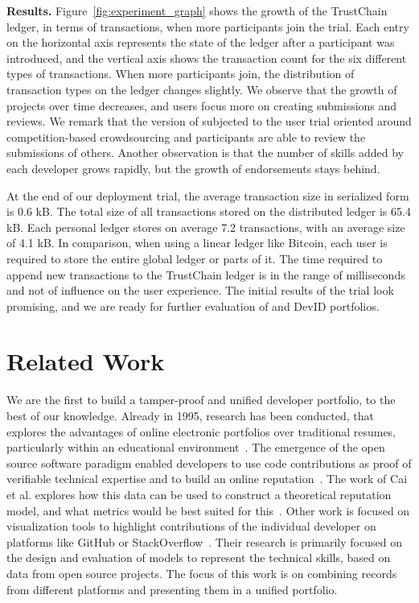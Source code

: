 \textbf{Results.}
Figure~\ref{fig:experiment_graph} shows the growth of the TrustChain ledger, in terms of transactions, when more participants join the trial.
Each entry on the horizontal axis represents the state of the ledger after a participant was introduced, and the vertical axis shows the transaction count for the six different types of transactions.
When more participants join, the distribution of transaction types on the ledger changes slightly.
We observe that the growth of projects over time decreases, and users focus more on creating submissions and reviews.
We remark that the version of \Dappcoder{} subjected to the user trial oriented around competition-based crowdsourcing and participants are able to review the submissions of others.
Another observation is that the number of skills added by each developer grows rapidly, but the growth of endorsements stays behind.

At the end of our deployment trial, the average transaction size in serialized form is 0.6 kB.
The total size of all transactions stored on the distributed ledger is 65.4 kB.
Each personal ledger stores on average 7.2 transactions, with an average size of 4.1 kB.
In comparison, when using a linear ledger like Bitcoin, each user is required to store the entire global ledger or parts of it.  
The time required to append new transactions to the TrustChain ledger is in the range of milliseconds and not of influence on the user experience.
The initial results of the trial look promising, and we are ready for further evaluation of \Dappcoder{} and DevID portfolios. 

\section{Related Work}
We are the first to build a tamper-proof and unified developer portfolio, to the best of our knowledge.
Already in 1995, research has been conducted, that explores the advantages of online electronic portfolios over traditional resumes, particularly within an educational environment~\cite{riggsby1995electronic,barrett1999electronic}.
The emergence of the open source software paradigm enabled developers to use code contributions as proof of verifiable technical expertise and to build an online reputation~\cite{riehle2015open}.
The work of Cai et al. explores how this data can be used to construct a theoretical reputation model, and what metrics would be best suited for this~\cite{cai2016reputation}.
Other work is focused on visualization tools to highlight contributions of the individual developer on platforms like GitHub or StackOverflow~\cite{jaruchotrattanasakul2016open,saxena2017know,chen2016supporting}.
Their research is primarily focused on the design and evaluation of models to represent the technical skills, based on data from open source projects.
The focus of this work is on combining records from different platforms and presenting them in a unified portfolio.

